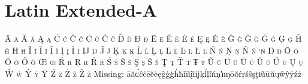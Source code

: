 

\presection\section*{\checkno Latin Extended-A}\postsection

\textsc{Ā ā Ă ă Ą ą Ć ć Ĉ ĉ Ċ ċ Č č Ď ď Đ đ Ē ē Ĕ ĕ Ė ė Ę ę Ě ě Ĝ ĝ Ğ ğ Ġ ġ Ģ ģ Ĥ ĥ Ħ ħ Ĩ ĩ Ī ī Ĭ ĭ Į į İ ı Ĳ ĳ Ĵ ĵ Ķ ķ ĸ Ĺ ĺ Ļ ļ Ľ ľ Ŀ ŀ Ł ł Ń ń Ņ ņ Ň ň ŉ Ŋ ŋ Ō ō Ŏ ŏ Ő ő Œ œ Ŕ ŕ Ŗ ŗ Ř ř Ś ś Ŝ ŝ Ş ş Š š Ţ ţ Ť ť Ŧ ŧ Ũ ũ Ū ū Ŭ ŭ Ů ů Ű ű Ų ų Ŵ ŵ Ŷ ŷ Ÿ Ź ź Ż ż Ž ž}
\hfill Missing: āăᴄ́ĉċēĕėęĝġģĥħĩīĭįi̇ijķĺļľńņŉŋōŏŕŗśŝşţŧũūŭųŵŷÿźż